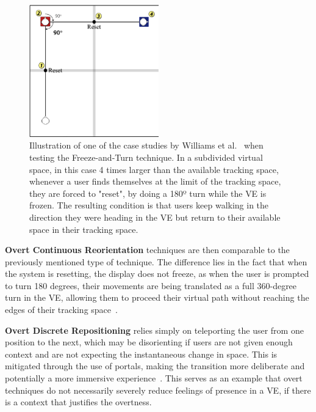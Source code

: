 \begin{figure}[t]
    \centering
    \includegraphics[width=0.5\textwidth]{NOVAthesisFiles/Images/papers/freeze-n-turn.png}
    \caption[Freeze-and-Turn use-case example]{Illustration of one of the case studies by Williams et al.~\cite{Williams2007} when testing the Freeze-and-Turn technique. 
    In a subdivided virtual space, in this case 4 times larger than the available tracking space, whenever a user finds themselves at the limit of 
    the tracking space, they are forced to "reset", by doing a 180º turn while the \gls{VE} is frozen. 
    The resulting condition is that users keep walking in the direction 
    they were heading in the \gls{VE} but return to their available space in their tracking space.}
    \label{fig:rdw-gains}
\end{figure}

\textbf{Overt Continuous Reorientation} techniques are then comparable to the previously mentioned type of technique. The difference lies 
in the fact that when the system is resetting, the display does not freeze, as when the user is prompted to turn 180 degrees, their movements 
are being translated as a full 360-degree turn in the \gls{VE}, allowing them to proceed their virtual path without reaching the edges of 
their tracking space~\cite{Williams2007}.

\textbf{Overt Discrete Repositioning} relies simply on teleporting the user from one position to the next, which may be disorienting if 
users are not given enough context and are not expecting the instantaneous change in space. This is mitigated through the use of portals, 
making the transition more deliberate and potentially a more immersive experience~\cite{6180877}. This serves as an example that 
overt techniques do not necessarily severely reduce feelings of presence in a \gls{VE}, if there is a context that justifies the overtness. 

